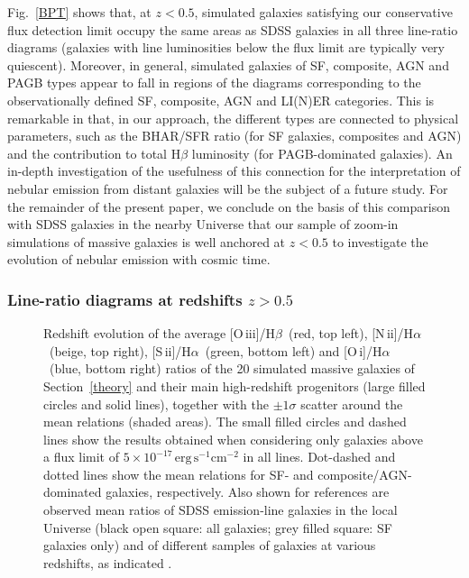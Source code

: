 \documentclass[fleqn,usenatbib]{mnras}
\newcommand{\oiiihb}{\hbox{[O\,{\sc iii}]/H$\beta$}}
\newcommand{\niiha}{\hbox{[N\,{\sc ii}]/H$\alpha$}}
\newcommand{\siiha}{\hbox{[S\,{\sc ii}]/H$\alpha$}}
\newcommand{\oiha}{\hbox{[O\,{\sc i}]/H$\alpha$}}
\begin{document}
Fig.~\ref{BPT} shows that, at $z<0.5$, simulated galaxies satisfying our conservative flux 
detection limit occupy the same areas as SDSS galaxies in all three line-ratio diagrams (galaxies
with line luminosities below the flux limit are typically very quiescent). Moreover, in general, 
simulated galaxies of SF, composite, AGN and PAGB types appear to fall in regions of the diagrams 
corresponding to the observationally defined SF, composite, AGN and LI(N)ER categories. This is remarkable in 
that, in our approach, the different types are connected to physical parameters, such as the BHAR/SFR
ratio (for SF galaxies, composites and AGN) and the contribution to total H$\beta$ luminosity 
(for PAGB-dominated galaxies). An in-depth investigation of the usefulness of this connection 
for the interpretation of nebular emission from distant galaxies will be the subject of a future 
study. For the remainder of the present paper, we conclude
on the basis of this comparison with SDSS galaxies in the nearby Universe that our sample of 
zoom-in simulations of massive galaxies is well anchored at $z<0.5$ to investigate the evolution 
of nebular emission with cosmic time.

\subsubsection{Line-ratio diagrams at redshifts $z>0.5$}\label{highzBPT}


\begin{figure*}
\caption{Redshift evolution of the average \oiiihb\ (red, top left), \niiha\ 
(beige, top right), \siiha\ (green, bottom left) and \oiha\ (blue, bottom right) 
ratios of the 20 simulated massive galaxies of Section~\ref{theory} and their 
main high-redshift progenitors (large filled circles and solid lines), together 
with the $\pm1\sigma$ scatter around the mean relations (shaded areas). The
small filled circles and dashed lines show the results obtained when considering 
only galaxies above a   flux limit of $\mathrm{5\times 10^{-17}\,erg\,s^{-1}cm^{-2}}$ 
in all lines. Dot-dashed and dotted lines show the mean relations for SF- and 
composite/AGN-dominated galaxies, respectively. Also shown for references are
observed mean ratios of SDSS emission-line galaxies in the local Universe 
(black open square: all galaxies; grey filled square: SF galaxies only) and of
different samples of galaxies at various redshifts, as indicated \citep{Yabe14,
Steidel14, Steidel16,Vanzella16}.}\label{Evol_lineratios}      
\end{figure*}
\end{document}
